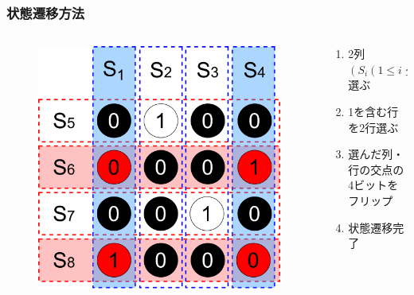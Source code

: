 \begin{frame}
  \frametitle{状態遷移方法}
  \begin{columns}
    \begin{column}{0.6\linewidth}
  \begin{figure}[h]
    \centering
    \includegraphics[width=0.8\linewidth]{data/kanzen2ji_bitflip}
  \end{figure}
    \end{column}
    \begin{column}{0.4\linewidth}
      \begin{enumerate}
        \item 2列$\left(S_i(1\leq i \leq 4)\right)$選ぶ
        \item 1を含む行を2行選ぶ
        \item 選んだ列・行の交点の4ビットをフリップ
        \item 状態遷移完了
      \end{enumerate}
    \end{column}
  \end{columns}
\end{frame}

